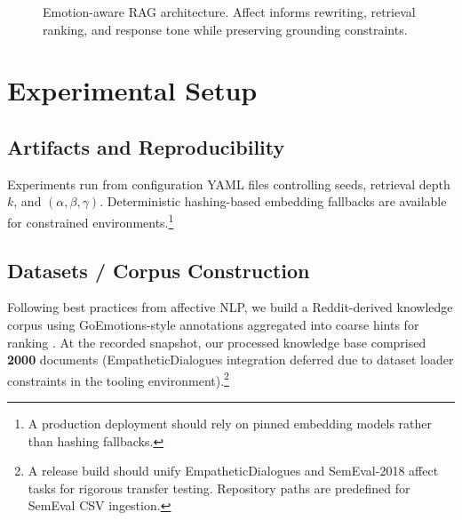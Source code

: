 \documentclass[conference]{IEEEtran}
\begin{document}
\begin{figure}[t]
\centering
{}
\caption{Emotion-aware RAG architecture. Affect informs rewriting, retrieval ranking, and response tone while preserving grounding constraints.}
\label{fig:arch}
\end{figure}

\section{Experimental Setup}
\subsection{Artifacts and Reproducibility}
Experiments run from configuration YAML files controlling seeds, retrieval depth $k$, and $(\alpha,\beta,\gamma)$. Deterministic hashing-based embedding fallbacks are available for constrained environments.\footnote{A production deployment should rely on pinned embedding models rather than hashing fallbacks.}

\subsection{Datasets / Corpus Construction}
Following best practices from affective NLP, we build a Reddit-derived knowledge corpus using GoEmotions-style annotations aggregated into coarse hints for ranking \cite{demszky2020goemotions}. At the recorded snapshot, our processed knowledge base comprised \textbf{2000} documents (EmpatheticDialogues integration deferred due to dataset loader constraints in the tooling environment).\footnote{A release build should unify EmpatheticDialogues \cite{rashkin2019empdialogues} and SemEval-2018 affect tasks for rigorous transfer testing. Repository paths are predefined for SemEval CSV ingestion.}
\end{document}

